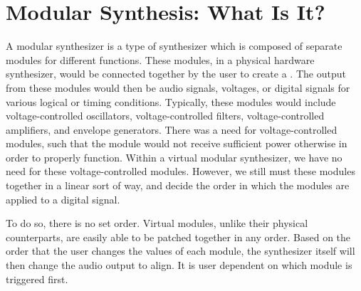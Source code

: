\section[Modular Synthesis: What Is It?]{Modular Synthesis: What Is It?}\label{section:modular-synth-what-is}

A modular synthesizer is a type of synthesizer which is composed of separate modules for different functions. These modules, in a physical hardware synthesizer, would be connected together by the user to create a . The output from these modules would then be audio signals, voltages, or digital signals for various logical or timing conditions. Typically, these modules would include voltage-controlled oscillators, voltage-controlled filters, voltage-controlled amplifiers, and envelope generators. There was a need for voltage-controlled modules, such that the module would not receive sufficient power otherwise in order to properly function. Within a virtual modular synthesizer, we have no need for these voltage-controlled modules. However, we still must  these modules together in a linear sort of way, and decide the order in which the modules are applied to a digital signal. 

To do so, there is no set order. Virtual modules, unlike their physical counterparts, are easily able to be patched together in any order. Based on the order that the user changes the values of each module, the synthesizer itself will then change the audio output to align. It is user dependent on which module is triggered first.

